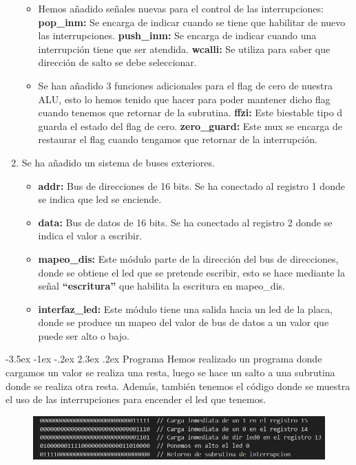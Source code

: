 \documentclass[11pt]{report}
\makeatletter
\renewcommand\chapter{\@startsection{chapter}{0}{\z@}%
    {-3.5ex \@plus -1ex \@minus -.2ex}%
    {2.3ex \@plus.2ex}%
    {\normalfont\Large\bfseries}}
\makeatother
\begin{document}
\begin{enumerate}
\begin{itemize}
          \item Hemos añadido señales nuevas para el control de las interrupciones:
                \subitem \textbf{pop\_inm:} Se encarga de indicar cuando se tiene que habilitar de nuevo las interrupciones.
                \subitem \textbf{push\_inm:} Se encarga de indicar cuando una interrupción tiene que ser atendida.
                \subitem \textbf{wcalli:} Se utiliza para saber que dirección de salto se debe seleccionar.
          \item Se han añadido 3 funciones adicionales para el flag de cero de nuestra ALU, esto lo hemos tenido que hacer para poder mantener dicho flag cuando tenemos que retornar de la subrutina.
                \subitem \textbf{ffzi:} Este biestable tipo d guarda el estado del flag de cero.
                \subitem \textbf{zero\_guard:} Este mux se encarga de restaurar el flag cuando tengamos que retornar de la interrupción.
        \end{itemize}
  \item Se ha añadido un sistema de buses exteriores.
        \begin{itemize}
          \item \textbf{addr:} Bus de direcciones de 16 bits. Se ha conectado al registro 1 donde se indica que led se enciende.
          \item \textbf{data:} Bus de datos de 16 bits. Se ha conectado al registro 2 donde se indica el valor a escribir.
          \item \textbf{mapeo\_dis:} Este módulo parte de la dirección del bus de direcciones, donde se obtiene el led que se pretende escribir, esto se hace mediante la señal \textbf{“escritura”} que habilita la escritura en mapeo\_dis.
          \item \textbf{interfaz\_led:} Este módulo tiene una salida hacia un led de la placa, donde se produce un mapeo del valor de bus de datos a un valor que puede ser alto o bajo.
        \end{itemize}
\end{enumerate}

\chapter{Programa}
Hemos realizado un programa donde cargamos un valor se realiza una resta, luego se hace un salto a una subrutina donde se realiza otra resta. Además, también tenemos el código  donde se muestra el uso de las interrupciones para encender el led que tenemos.
\begin{figure}[H]
  \centering
  \includegraphics[width=1\textwidth]{img/Programa_Binario.png}
\end{figure}
\end{document}
